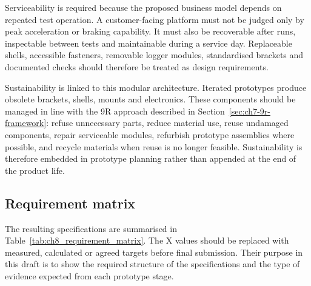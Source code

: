 Serviceability is required because the proposed business model depends on repeated test operation. A customer-facing platform must not be judged only by peak acceleration or braking capability. It must also be recoverable after runs, inspectable between tests and maintainable during a service day. Replaceable shells, accessible fasteners, removable logger modules, standardised brackets and documented checks should therefore be treated as design requirements.

Sustainability is linked to this modular architecture. Iterated prototypes produce obsolete brackets, shells, mounts and electronics. These components should be managed in line with the 9R approach described in Section~\ref{sec:ch7-9r-framework}: refuse unnecessary parts, reduce material use, reuse undamaged components, repair serviceable modules, refurbish prototype assemblies where possible, and recycle materials when reuse is no longer feasible. Sustainability is therefore embedded in prototype planning rather than appended at the end of the product life.

\subsection{Requirement matrix}
\label{sec:ch8_requirement_matrix}

The resulting specifications are summarised in Table~\ref{tab:ch8_requirement_matrix}. The X values should be replaced with measured, calculated or agreed targets before final submission. Their purpose in this draft is to show the required structure of the specifications and the type of evidence expected from each prototype stage.

